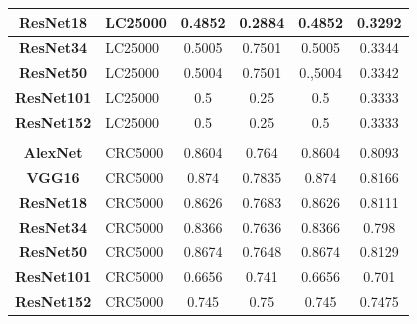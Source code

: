 \begin{table}[t!]
\begin{tabular}{|c|l|c|c|c|c|}
\textbf{ResNet18}      & LC25000                               & 0.4852                & 0.2884                & 0.4852                & 0.3292                \\ \hline
\textbf{ResNet34}      & LC25000                               & 0.5005                & 0.7501                & 0.5005                & 0.3344                \\ \hline
\textbf{ResNet50}      & LC25000                               & 0.5004                & 0.7501                & 0.,5004               & 0.3342                \\ \hline
\textbf{ResNet101}     & LC25000                               & 0.5                   & 0.25                  & 0.5                   & 0.3333                \\ \hline
\textbf{ResNet152}     & LC25000                               & 0.5                   & 0.25                  & 0.5                   & 0.3333                \\ \hline
\multicolumn{1}{|l|}{} &                                       & \multicolumn{1}{l|}{} & \multicolumn{1}{l|}{} & \multicolumn{1}{l|}{} & \multicolumn{1}{l|}{} \\ \hline
\textbf{AlexNet}       & CRC5000                               & 0.8604                & 0.764                 & 0.8604                & 0.8093                \\ \hline
\textbf{VGG16}         & CRC5000                               & 0.874                 & 0.7835                & 0.874                 & 0.8166                \\ \hline
\textbf{ResNet18}      & CRC5000                               & 0.8626                & 0.7683                & 0.8626                & 0.8111                \\ \hline
\textbf{ResNet34}      & CRC5000                               & 0.8366                & 0.7636                & 0.8366                & 0.798                 \\ \hline
\textbf{ResNet50}      & CRC5000                               & 0.8674                & 0.7648                & 0.8674                & 0.8129                \\ \hline
\textbf{ResNet101}     & CRC5000                               & 0.6656                & 0.741                 & 0.6656                & 0.701                 \\ \hline
\textbf{ResNet152}     & CRC5000                               & 0.745                 & 0.75                  & 0.745                 & 0.7475                \\ \hline
\end{tabular}

\end{table}



